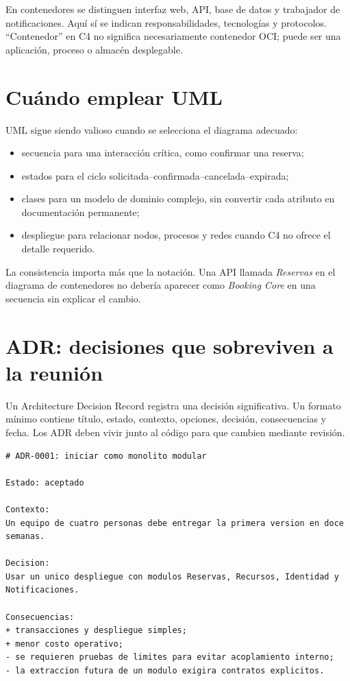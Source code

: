 En contenedores se distinguen interfaz web, API, base de datos y trabajador de notificaciones. Aquí sí se indican responsabilidades, tecnologías y protocolos. ``Contenedor'' en C4 no significa necesariamente contenedor OCI; puede ser una aplicación, proceso o almacén desplegable.

\section{Cuándo emplear UML}
UML sigue siendo valioso cuando se selecciona el diagrama adecuado:
\begin{itemize}
  \item secuencia para una interacción crítica, como confirmar una reserva;
  \item estados para el ciclo solicitada--confirmada--cancelada--expirada;
  \item clases para un modelo de dominio complejo, sin convertir cada atributo en documentación permanente;
  \item despliegue para relacionar nodos, procesos y redes cuando C4 no ofrece el detalle requerido.
\end{itemize}

La consistencia importa más que la notación. Una API llamada \emph{Reservas} en el diagrama de contenedores no debería aparecer como \emph{Booking Core} en una secuencia sin explicar el cambio.

\section{ADR: decisiones que sobreviven a la reunión}
Un Architecture Decision Record registra una decisión significativa. Un formato mínimo contiene título, estado, contexto, opciones, decisión, consecuencias y fecha. Los ADR deben vivir junto al código para que cambien mediante revisión.

\begin{lstlisting}
# ADR-0001: iniciar como monolito modular

Estado: aceptado

Contexto:
Un equipo de cuatro personas debe entregar la primera version en doce semanas.

Decision:
Usar un unico despliegue con modulos Reservas, Recursos, Identidad y Notificaciones.

Consecuencias:
+ transacciones y despliegue simples;
+ menor costo operativo;
- se requieren pruebas de limites para evitar acoplamiento interno;
- la extraccion futura de un modulo exigira contratos explicitos.
\end{lstlisting}

